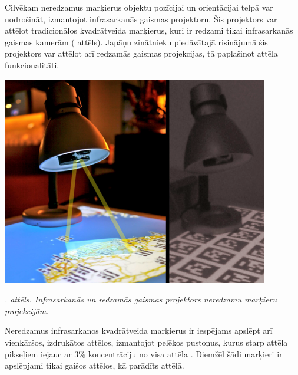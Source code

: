 \documentclass[12pt, a4paper, oneside, openright]{article}
\renewcommand{\thecimages}{\arabic{cimages}}
\begin{document}
\par
Cilvēkam neredzamus marķierus objektu pozīcijai un orientācijai telpā var nodrošināt, izmantojot 
infrasarkanās gaismas projektoru. Šis projektors var attēlot tradicionālos kvadrātveida marķierus, kuri
ir redzami tikai infrasarkanās gaismas kamerām ( attēls). 
Japāņu zinātnieku piedāvātajā risinājumā šis projektors
var attēlot arī redzamās gaismas projekcijas, tā paplašinot attēla funkcionalitāti\cite{Li-WeiChan2010}.

\label{cimages:WeiChan2010_1}
\vspace{10pt}
\begin{samepage}
\begin{center}
\includegraphics[width=0.5\columnwidth]{images/WeiChan2010_1.png}
\begin{center}
\footnotesize{
\textit{\thecimages. attēls. Infrasarkanās un redzamās gaismas projektors neredzamu marķieru projekcijām.}}
\end{center}
\end{center}
\end{samepage}

\par 
Neredzamus infrasarkanos kvadrātveida marķierus ir iespējams apslēpt arī vienkāršos, izdrukātos attēlos,
izmantojot pelēkos pustoņus, kurus starp attēla pikseļiem iejauc ar 3$\%$ koncentrāciju no visa attēla \cite{Hsi-ChunWang2008}.
Diemžēl šādi marķieri ir apslēpjami tikai gaišos attēlos, kā parādīts  attēlā.
\end{document}

